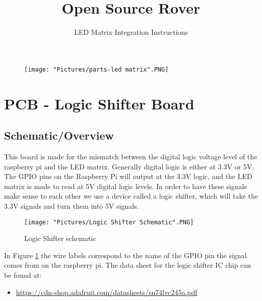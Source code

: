 \documentclass[12pt]{article}
\begin{document}
\title{Open Source Rover}
\author{LED Matrix Integration Instructions}

\makeatletter         
\def\@maketitle{
\begin{center}	
	\makebox[\textwidth][c]{ \texttt{[image: "Pictures/LED head".png]}}
	{\Huge \bfseries \sffamily \@title }\\[4ex] 
	{\huge \bfseries \sffamily \@author}\\[4ex] 
	\texttt{[image: "Pictures/JPL logo".png]}
\end{center}}
\makeatother

\maketitle

\newpage


\tableofcontents

\newpage 	

\begin{figure}[H]
	\centering
	\texttt{[image: "Pictures/parts-led matrix".PNG]}
\end{figure}


\section{PCB - Logic Shifter Board} 
\subsection{Schematic/Overview}
This board is made for the mismatch between the digital logic voltage level of the raspberry pi and the LED matrix. Generally digital logic is either at 3.3V or 5V. The GPIO pins on the Raspberry Pi will output at the 3.3V logic, and the LED matrix is made to read at 5V digital logic levels. In order to have these signals make sense to each other we use a device called a logic shifter, which will take the 3.3V signals and turn them into 5V signals. 

\begin{figure}[H]
  	\centering
    	\texttt{[image: "Pictures/Logic Shifter Schematic".PNG]}
 	\caption{Logic Shifter schematic}
	\label{ls sch}
\end{figure}

In Figure \ref{ls sch} the wire labels correspond to the name of the GPIO pin the signal comes from on the raspberry pi. The data sheet for the logic shifter IC chip can be found at: 
\begin{itemize}
	\item \href{https://cdn-shop.adafruit.com/datasheets/sn74lvc245a.pdf}{https://cdn-shop.adafruit.com/datasheets/sn74lvc245a.pdf}
\end{itemize}
\end{document}
